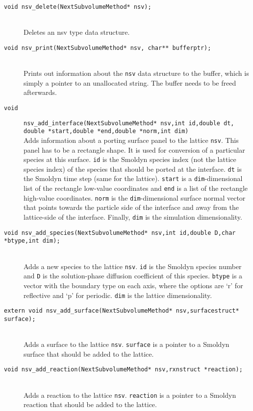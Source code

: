 \documentclass {book}
\begin{document}
\begin{description}
\item[\texttt{void nsv\_delete(NextSubvolumeMethod* nsv);}]
\hfill \\
Deletes an nsv type data structure.

\item[\texttt{void nsv\_print(NextSubvolumeMethod* nsv, char** bufferptr);}]
\hfill \\
Prints out information about the \texttt{nsv} data structure to the buffer, which is simply a pointer to an unallocated string. The buffer needs to be freed afterwards.

\item[\texttt{void}]
\texttt{nsv\_add\_interface(NextSubvolumeMethod* nsv,int id,double dt, double *start,double *end,double *norm,int dim)}
\hfill \\
Adds information about a porting surface panel to the lattice \texttt{nsv}. This panel has to be a rectangle shape.  It is used for conversion of a particular species at this surface.  \texttt{id} is the Smoldyn species index (not the lattice species index) of the species that should be ported at the interface. \texttt{dt} is the Smoldyn time step (same for the lattice). \texttt{start} is a \texttt{dim}-dimensional list of the rectangle low-value coordinates and \texttt{end} is a list of the rectangle high-value coordinates. \texttt{norm} is the \texttt{dim}-dimensional surface normal vector that points towards the particle side of the interface and away from the lattice-side of the interface. Finally, \texttt{dim} is the simulation dimensionality.

\item[\texttt{void nsv\_add\_species(NextSubvolumeMethod* nsv,int id,double D,char *btype,int dim);}]
\hfill \\
Adds a new species to the lattice \texttt{nsv}. \texttt{id} is the Smoldyn species number and \texttt{D} is the solution-phase diffusion coefficient of this species. \texttt{btype} is a vector with the boundary type on each axis, where the options are `r' for reflective and `p' for periodic. \texttt{dim} is the lattice dimensionality.

\item[\texttt{extern void nsv\_add\_surface(NextSubvolumeMethod* nsv,surfacestruct* surface);}]
\hfill \\
Adds a surface to the lattice \texttt{nsv}. \texttt{surface} is a pointer to a Smoldyn surface that should be added to the lattice.

\item[\texttt{void nsv\_add\_reaction(NextSubvolumeMethod* nsv,rxnstruct *reaction);}]
\hfill \\
Adds a reaction to the lattice \texttt{nsv}. \texttt{reaction} is a pointer to a Smoldyn reaction that should be added to the lattice.


\end{description}
\end{document}
